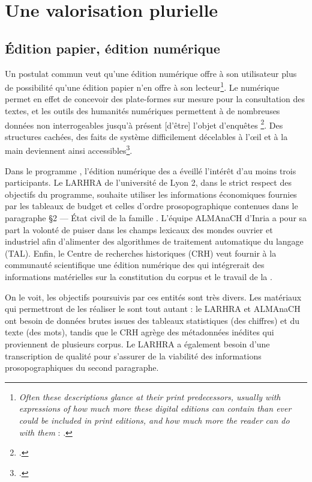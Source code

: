 \chapter{Une valorisation plurielle}

\section{Édition papier, édition numérique}

Un postulat commun veut qu'une édition numérique offre à son utilisateur plus de possibilité qu'une édition papier n'en offre à son lecteur\footnote{\og \textit{Often these descriptions glance at their print predecessors, usually with expressions of how much more these digital editions can contain than ever could be included in print editions, and how much more the reader can do with them} \fg{} : \cite[p. 105-106]{robinson}.}. Le numérique permet en effet de concevoir des plate-formes sur mesure pour la consultation des textes, et les outils des humanités numériques permettent à \og de nombreuses données non interrogeables jusqu’à présent [d'être] l’objet d’enquêtes \fg\footcite[p. 20]{duval}. \og Des structures cachées, des faits de système difficilement décelables à l’œil et à la main \fg{} deviennent ainsi accessibles\footcite{duval}.

Dans le programme \timeus{}, l'édition numérique des \odm{} a éveillé l'intérêt d'au moins trois participants. Le LARHRA de l'université de Lyon 2, dans le strict respect des objectifs du programme, souhaite utiliser les informations économiques fournies par les tableaux de budget et celles d'ordre prosopographique contenues dans le paragraphe \og §2 --- État civil de la famille \fg. L'équipe ALMAnaCH d'Inria a pour sa part la volonté de puiser dans les champs lexicaux des mondes ouvrier et industriel afin d'alimenter des algorithmes de traitement automatique du langage (TAL). Enfin, le Centre de recherches historiques (CRH) veut fournir à la communauté scientifique une édition numérique des \odm{} qui intégrerait des informations matérielles sur la constitution du corpus et le travail de la \sess.

On le voit, les objectifs poursuivis par ces entités sont très divers. Les matériaux qui permettront de les réaliser le sont tout autant : le LARHRA et ALMAnaCH ont besoin de données brutes issues des tableaux statistiques (des chiffres) et du texte (des mots), tandis que le CRH agrège des métadonnées inédites qui proviennent de plusieurs corpus. Le LARHRA a également besoin d'une transcription de qualité pour s'assurer de la viabilité des informations prosopographiques du second paragraphe.


